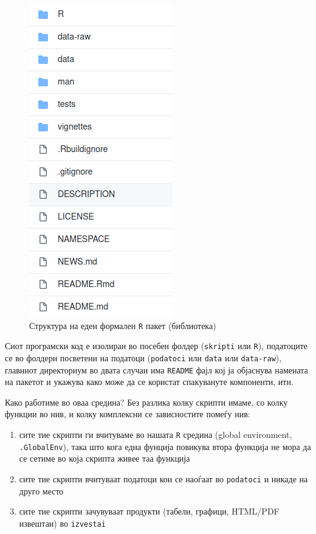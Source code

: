 \documentclass[
]{book}
\providecommand{\tightlist}{%
  \setlength{\itemsep}{0pt}\setlength{\parskip}{0pt}}
\begin{document}
\begin{figure}
\centering
\includegraphics{www/package-structure.png}
\caption{Структура на еден формален \texttt{R} пакет (библиотека)}
\end{figure}

Сиот програмски код е изолиран во посебен фолдер (\texttt{skripti} или \texttt{R}), податоците се во фолдери посветени на податоци (\texttt{podatoci} или \texttt{data} или \texttt{data-raw}), главниот директориум во двата случаи има \texttt{README} фајл кој ја објаснува намената на пакетот и укажува како може да се користат спакувануте компоненти, итн.

Како работиме во оваа средина? Без разлика колку скрипти имаме, со колку функции во нив, и колку комплексни се зависностите помеѓу нив:

\begin{enumerate}
\def\labelenumi{\arabic{enumi}.}
\tightlist
\item
  сите тие скрипти ги вчитуваме во нашата \texttt{R} средина (global environment, \texttt{.GlobalEnv}), така што кога една фунција повикува втора функција не мора да се сетиме во која скрипта живее таа функција\\
\item
  сите тие скрипти вчитуваат податоци кои се наоѓаат во \texttt{podatoci} и никаде на друго место\\
\item
  сите тие скрипти зачувуваат продукти (табели, графици, HTML/PDF извештаи) во \texttt{izvestai}
\end{enumerate}
\end{document}
